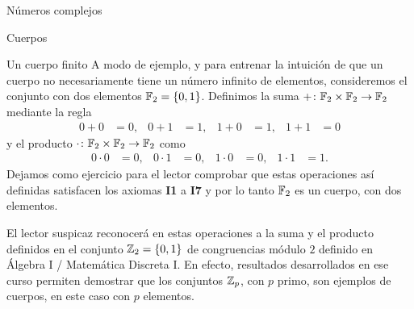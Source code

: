 \begin{chapter}{N\'umeros complejos}
\begin{section}{Cuerpos}
    \begin{subsection}{Un cuerpo finito}
        A modo de ejemplo, y para entrenar la intuición de que un cuerpo no necesariamente tiene un número infinito de elementos, consideremos el conjunto con dos elementos $\mathbb F_2=\{0,1\}$. Definimos la suma $+\colon\mathbb F_2\times \mathbb F_2\to \mathbb F_2$ mediante la regla
        \begin{align*}
            0+0 & =0, & 0+1 & =1, & 1+0 & =1, & 1+1 & =0
        \end{align*}
        y el producto $\cdot \colon\mathbb F_2\times \mathbb F_2\to \mathbb F_2$ como
        \begin{align*}
            0\cdot 0 & =0, & 0\cdot 1 & =0, & 1\cdot 0 & =0, & 1\cdot 1 & =1.
        \end{align*}
        Dejamos como ejercicio para el lector comprobar que estas operaciones así definidas satisfacen los axiomas \textbf{I1} a \textbf{I7} y por lo tanto $\mathbb F_2$ es un cuerpo, con dos elementos.

        \begin{observacion*}
            El lector suspicaz reconocerá en estas operaciones a la suma y el producto definidos en el conjunto $\mathbb Z_2=\{0,1\}$ de congruencias módulo $2$  definido en Álgebra I / Matemática Discreta I. En efecto, resultados desarrollados en ese curso permiten demostrar que los conjuntos $\mathbb Z_p$, con $p$ primo, son ejemplos de cuerpos, en este caso con $p$ elementos.
        \end{observacion*}


\end{subsection}
\end{section}
\end{chapter}
